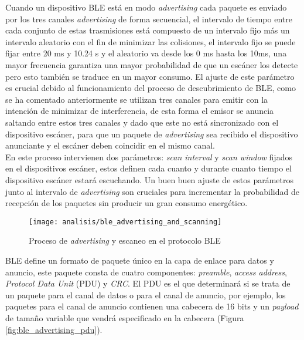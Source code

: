 \documentclass[../proyecto.tex]{subfiles}
\begin{document}
Cuando un dispositivo BLE está en modo \textit{advertising} cada paquete es enviado por los tres canales \textit{advertising} de forma secuencial, el intervalo de tiempo entre cada conjunto de estas trasmisiones está compuesto de un intervalo fijo más un intervalo aleatorio con el fin de minimizar las colisiones, el intervalo fijo se puede fijar entre 20 ms y 10.24 s y el aleatorio va desde los 0 ms hasta los 10ms, una mayor frecuencia garantiza una mayor probabilidad de que un escáner los detecte pero esto también se traduce en un mayor consumo. El ajuste de este parámetro es crucial debido al funcionamiento del proceso de descubrimiento de BLE, como se ha comentado anteriormente se utilizan tres canales para emitir con la intención de minimizar de interferencia, de esta forma el emisor se anuncia saltando entre estos tres canales y dado que este no está sincronizado con el dispositivo escáner, para que un paquete de \textit{advertising} sea recibido el dispositivo anunciante y el escáner deben coincidir en el mismo canal.\\

En este proceso intervienen dos parámetros:  \textit{scan interval} y  \textit{scan window} fijados en el dispositivos escáner, estos definen cada cuanto y durante cuanto tiempo el dispositivo escáner estará escuchando. Un buen buen ajuste de estos parámetros junto al intervalo de \textit{advertising} son cruciales para incrementar la probabilidad de recepción de los paquetes sin producir un gran consumo energético.\\

\begin{figure}[H]
\centering
\texttt{[image: analisis/ble\_advertising\_and\_scanning]}
\caption{Proceso de \textit{advertising} y escaneo en el protocolo BLE \cite{townsend2014getting}}
\label{fig:ble_advertising_and_scanning}
\end{figure}

BLE define un formato de paquete único en la capa de enlace para datos y anuncio, este paquete consta de cuatro componentes: \textit{preamble}, \textit{access address}, \textit{Protocol Data Unit} (PDU) y \textit{CRC}. El PDU es el que determinará si se trata de un paquete para el canal de datos o para el canal de anuncio, por ejemplo, los paquetes para el canal de anuncio contienen una cabecera de 16 bits y un \textit{payload} de tamaño variable que vendrá especificado en la cabecera (Figura \ref{fig:ble_advertising_pdu}). \\
\end{document}
